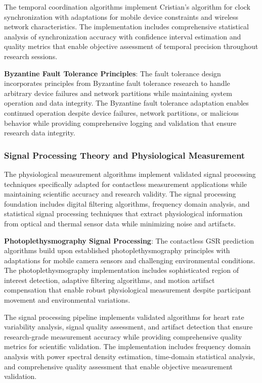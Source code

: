 \documentclass[11pt,a4paper]{article}
\begin{document}
The temporal coordination algorithms implement Cristian's algorithm for clock synchronization with adaptations for
mobile device constraints and wireless network characteristics. The implementation includes comprehensive statistical
analysis of synchronization accuracy with confidence interval estimation and quality metrics that enable objective
assessment of temporal precision throughout research sessions.

\textbf{Byzantine Fault Tolerance Principles}: The fault tolerance design incorporates principles from Byzantine fault
tolerance research to handle arbitrary device failures and network partitions while maintaining system operation and
data integrity. The Byzantine fault tolerance adaptation enables continued operation despite device failures, network
partitions, or malicious behavior while providing comprehensive logging and validation that ensure research data
integrity.

\subsubsection{Signal Processing Theory and Physiological Measurement}

The physiological measurement algorithms implement validated signal processing techniques specifically adapted for
contactless measurement applications while maintaining scientific accuracy and research validity. The signal processing
foundation includes digital filtering algorithms, frequency domain analysis, and statistical signal processing
techniques that extract physiological information from optical and thermal sensor data while minimizing noise and
artifacts.

\textbf{Photoplethysmography Signal Processing}: The contactless GSR prediction algorithms build upon established
photoplethysmography principles with adaptations for mobile camera sensors and challenging environmental conditions. The
photoplethysmography implementation includes sophisticated region of interest detection, adaptive filtering algorithms,
and motion artifact compensation that enable robust physiological measurement despite participant movement and
environmental variations.

The signal processing pipeline implements validated algorithms for heart rate variability analysis, signal quality
assessment, and artifact detection that ensure research-grade measurement accuracy while providing comprehensive quality
metrics for scientific validation. The implementation includes frequency domain analysis with power spectral density
estimation, time-domain statistical analysis, and comprehensive quality assessment that enable objective measurement
validation.
\end{document}
